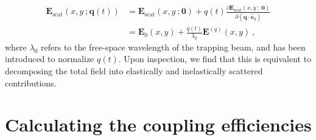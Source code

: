 \documentclass[%
 reprint,
 amsmath,amssymb,
 aps,
pra,
]{revtex4-2}
\begin{document}
\begin{align}
    \boldsymbol{E}_{\mathrm{scat}}(x, y~; \boldsymbol{q}(t)) &= \boldsymbol{E}_{\mathrm{scat}}(x, y~; \boldsymbol{0}) + q(t)\frac{\partial\boldsymbol{E}_{\mathrm{scat}}(x, y ~;~ \boldsymbol{0})}{\partial(\boldsymbol{q}\cdot\hat{\boldsymbol{e}}_{q})} \nonumber \\
    &= \boldsymbol{E}_{0}(x, y) + \frac{q(t)}{\lambda_{0}}\boldsymbol{E}^{(q)}(x, y) ~ , \label{ScatteredFieldDecomp}
\end{align}
where $\lambda_{0}$ refers to the free-space wavelength of the trapping beam, and has been introduced to normalize $q(t)$. Upon inspection, we find that this is equivalent to decomposing the total field into elastically and inelastically scattered contributions. 


\section{Calculating the coupling efficiencies}\label{sec:CouplingCalcs}
\end{document}
